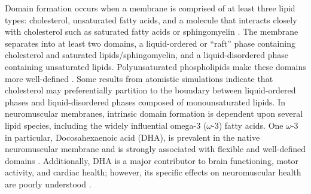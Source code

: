 Domain formation occurs when a membrane is comprised of at least three lipid types: cholesterol, unsaturated fatty acids, and a molecule that interacts closely with cholesterol such as saturated fatty acids or sphingomyelin \citep{Feller_Acyl_2008,Yeagle2016115}.  The membrane separates into at least two domains, a liquid-ordered or ``raft'' phase containing cholesterol and saturated lipids/sphingomyelin, and a liquid-disordered phase containing unsaturated lipids. Polyunsaturated phospholipids make these domains more well-defined \citep{Levental_Polyunsaturated_2016}. Some results from atomistic simulations \citep{Sodt2014, Iyer2018} indicate that cholesterol may preferentially partition to the boundary between liquid-ordered phases and liquid-disordered phases composed of monounsaturated lipids.  In neuromuscular membranes, intrinsic domain formation is dependent upon several lipid species, including the widely influential omega-3 ($\omega$-3) fatty acids. One $\omega$-3 in particular, Docosahexaenoic acid (DHA), is prevalent in the native neuromuscular membrane and is strongly associated with flexible and well-defined domains  \citep{Turk2013,Shaikh2004}. Additionally, DHA is a major contributor to brain functioning, motor activity, and cardiac health; however, its specific effects on neuromuscular health are poorly understood \citep{12439486320170901,S000930840800032720080101,Georgieva2015}. 


